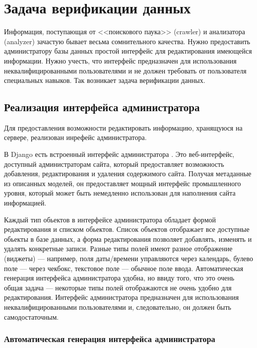 \section{Задача верификации данных}

Информация, поступающая от <<поискового паука>> (crawler) и анализатора (analyzer) зачастую бывает весьма сомнительного качества. Нужно предоставить администратору базы данных простой интерфейс для редактирования имеющейся информации. Нужно учесть, что интерфейс предназначен для использования неквалифицированными пользователями и не должен требовать от пользователя специальных навыков. Так возникает задача верификации данных.

\subsection{Реализация интерфейса администратора}

Для предоставления возможности редактировать информацию, хранящуюся на сервере, реализован инрефейс администратора.

В Django есть встроенный интерфейс администратора \cite{doc-admin, djbook-admin}. Это веб-интерфейс, доступный администраторам сайта, который предоставляет возможность добавления, редактирования и удаления содержимого сайта. Получая метаданные из описанных моделей, он предоставляет мощный интерфейс промышленного уровня, который может быть немедленно использован для наполнения сайта информацией.

Каждый тип обьектов в интерфейсе администратора обладает формой редактирования и списком обьектов. Список объектов отображает все доступные обьекты в базе данных, а форма редактирования позволяет добавлять, изменять и удалять конкретные записи. 
Разные типы полей имеют разное отображение (виджеты) --- например, поля даты/времени управляются через календарь, булево поле --- через чекбокс, текстовое поле --- обычное поле ввода. 
Автоматическая генерация интерфейса администратора удобна, но ввиду того, что это очень общая задача --- некоторые типы полей отображаются не очень удобно для редактирования. Интерфейс администратора предназначен для использования неквалифицированными пользователями и, следовательно, он должен быть самодостаточным.

\subsubsection{Автоматическая генерация интерфейса администратора}

